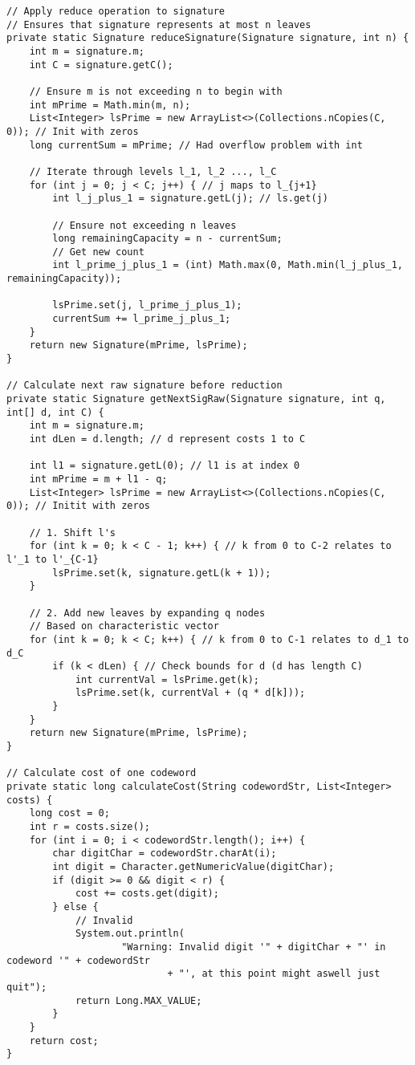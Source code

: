 \documentclass[a4paper,10pt,ngerman]{scrartcl}
\begin{document}
\begin{lstlisting}
// Apply reduce operation to signature
// Ensures that signature represents at most n leaves
private static Signature reduceSignature(Signature signature, int n) {
    int m = signature.m;
    int C = signature.getC();

    // Ensure m is not exceeding n to begin with
    int mPrime = Math.min(m, n);
    List<Integer> lsPrime = new ArrayList<>(Collections.nCopies(C, 0)); // Init with zeros
    long currentSum = mPrime; // Had overflow problem with int

    // Iterate through levels l_1, l_2 ..., l_C
    for (int j = 0; j < C; j++) { // j maps to l_{j+1}
        int l_j_plus_1 = signature.getL(j); // ls.get(j)

        // Ensure not exceeding n leaves
        long remainingCapacity = n - currentSum;
        // Get new count
        int l_prime_j_plus_1 = (int) Math.max(0, Math.min(l_j_plus_1, remainingCapacity));

        lsPrime.set(j, l_prime_j_plus_1);
        currentSum += l_prime_j_plus_1;
    }
    return new Signature(mPrime, lsPrime);
}

// Calculate next raw signature before reduction
private static Signature getNextSigRaw(Signature signature, int q, int[] d, int C) {
    int m = signature.m;
    int dLen = d.length; // d represent costs 1 to C

    int l1 = signature.getL(0); // l1 is at index 0
    int mPrime = m + l1 - q;
    List<Integer> lsPrime = new ArrayList<>(Collections.nCopies(C, 0)); // Initit with zeros

    // 1. Shift l's
    for (int k = 0; k < C - 1; k++) { // k from 0 to C-2 relates to l'_1 to l'_{C-1}
        lsPrime.set(k, signature.getL(k + 1));
    }

    // 2. Add new leaves by expanding q nodes
    // Based on characteristic vector
    for (int k = 0; k < C; k++) { // k from 0 to C-1 relates to d_1 to d_C
        if (k < dLen) { // Check bounds for d (d has length C)
            int currentVal = lsPrime.get(k);
            lsPrime.set(k, currentVal + (q * d[k]));
        }
    }
    return new Signature(mPrime, lsPrime);
}

// Calculate cost of one codeword
private static long calculateCost(String codewordStr, List<Integer> costs) {
    long cost = 0;
    int r = costs.size();
    for (int i = 0; i < codewordStr.length(); i++) {
        char digitChar = codewordStr.charAt(i);
        int digit = Character.getNumericValue(digitChar);
        if (digit >= 0 && digit < r) {
            cost += costs.get(digit);
        } else {
            // Invalid
            System.out.println(
                    "Warning: Invalid digit '" + digitChar + "' in codeword '" + codewordStr
                            + "', at this point might aswell just quit");
            return Long.MAX_VALUE;
        }
    }
    return cost;
}
\end{lstlisting}
\end{document}
